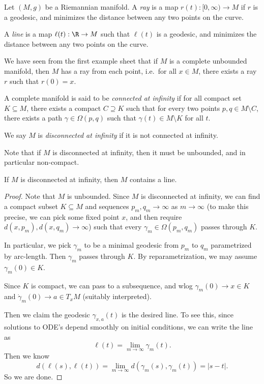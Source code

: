 \documentclass[a4paper]{article}
\begin{document}
\begin{defi}[Ray]
  Let $(M, g)$ be a Riemannian manifold. A \emph{ray} is a map $r(t): [0, \infty) \to M$ if $r$ is a geodesic, and minimizes the distance between any two points on the curve.
\end{defi}

\begin{defi}[Line]
  A \emph{line} is a map $\ell(t): \R \to M$ such that $\ell(t)$ is a geodesic, and minimizes the distance between any two points on the curve.
\end{defi}

We have seen from the first example sheet that if $M$ is a complete unbounded manifold, then $M$ has a ray from each point, i.e.\ for all $x \in M$, there exists a ray $r$ such that $r(0) = x$.

\begin{defi}
  A complete manifold is said to be \emph{connected at infinity} if for all compact set $K \subseteq M$, there exists a compact $C \supseteq K$ such that for every two points $p, q \in M \setminus C$, there exists a path $\gamma \in \Omega(p, q)$ such that $\gamma(t) \in M \setminus K$ for all $t$.

  We say $M$ is \emph{disconnected at infinity} if it is not connected at infinity.
\end{defi}

Note that if $M$ is disconnected at infinity, then it must be unbounded, and in particular non-compact.

\begin{lemma}
  If $M$ is disconnected at infinity, then $M$ contains a line.
\end{lemma}

\begin{proof}
  Note that $M$ is unbounded. Since $M$ is disconnected at infinity, we can find a compact subset $K \subseteq M$ and sequences $p_m, q_m \to \infty$ as $m \to \infty$ (to make this precise, we can pick some fixed point $x$, and then require $d(x, p_m), d(x, q_m) \to \infty$) such that every $\gamma_m \in \Omega(p_m, q_m)$ passes through $K$.

  In particular, we pick $\gamma_m$ to be a minimal geodesic from $p_m$ to $q_m$ parametrized by arc-length. Then $\gamma_m$ passes through $K$. By reparametrization, we may assume $\gamma_m(0) \in K$.

  Since $K$ is compact, we can pass to a subsequence, and wlog $\gamma_m(0) \to x \in K$ and $\dot{\gamma}_m(0) \to a \in T_xM$ (suitably interpreted).

  Then we claim the geodesic $\gamma_{x, a}(t)$ is the desired line. To see this, since solutions to ODE's depend smoothly on initial conditions, we can write the line as
  \[
    \ell(t) = \lim_{m \to \infty} \gamma_m(t).
  \]
  Then we know
  \[
    d(\ell(s), \ell(t)) = \lim_{m \to \infty} d(\gamma_m(s), \gamma_m(t)) = |s - t|.
  \]
  So we are done.
\end{proof}
\end{document}
